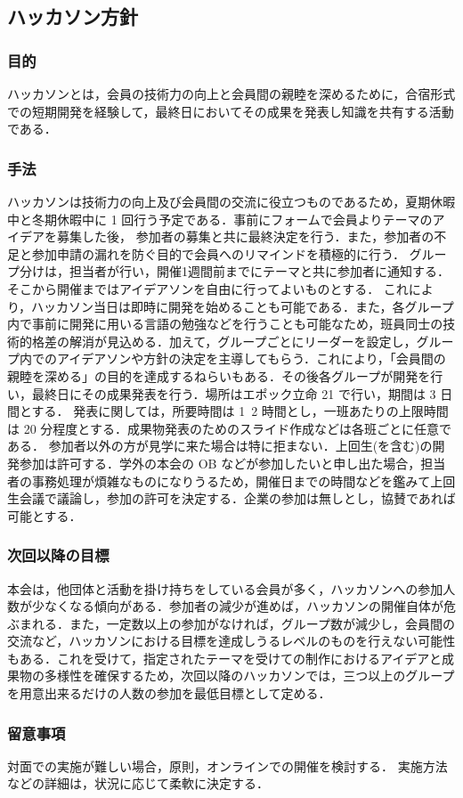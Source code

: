 \subsection*{ハッカソン方針}


\subsubsection*{目的}
ハッカソンとは，会員の技術力の向上と会員間の親睦を深めるために，合宿形式での短期開発を経験して，最終日においてその成果を発表し知識を共有する活動である．

\subsubsection*{手法}
ハッカソンは技術力の向上及び会員間の交流に役立つものであるため，夏期休暇中と冬期休暇中に 1 回行う予定である．事前にフォームで会員よりテーマのアイデアを募集した後，
参加者の募集と共に最終決定を行う．また，参加者の不足と参加申請の漏れを防ぐ目的で会員へのリマインドを積極的に行う．
グループ分けは，担当者が行い，開催1週間前までにテーマと共に参加者に通知する．
そこから開催まではアイデアソンを自由に行ってよいものとする．
これにより，ハッカソン当日は即時に開発を始めることも可能である．また，各グループ内で事前に開発に用いる言語の勉強などを行うことも可能なため，班員同士の技術的格差の解消が見込める．加えて，グループごとにリーダーを設定し，グループ内でのアイデアソンや方針の決定を主導してもらう．これにより，「会員間の親睦を深める」の目的を達成するねらいもある．その後各グループが開発を行い，最終日にその成果発表を行う．場所はエポック立命 21 で行い，期間は 3 日間とする．
発表に関しては，所要時間は 1~2 時間とし，一班あたりの上限時間は 20 分程度とする．成果物発表のためのスライド作成などは各班ごとに任意である．
参加者以外の方が見学に来た場合は特に拒まない．上回生(\fourthGrade を含む)の開発参加は許可する．学外の本会の OB などが参加したいと申し出た場合，担当者の事務処理が煩雑なものになりうるため，開催日までの時間などを鑑みて上回生会議で議論し，参加の許可を決定する．企業の参加は無しとし，協賛であれば可能とする．

\subsubsection*{次回以降の目標}
本会は，他団体と活動を掛け持ちをしている会員が多く，ハッカソンへの参加人数が少なくなる傾向がある．参加者の減少が進めば，ハッカソンの開催自体が危ぶまれる．また，一定数以上の参加がなければ，グループ数が減少し，会員間の交流など，ハッカソンにおける目標を達成しうるレベルのものを行えない可能性もある．これを受けて，指定されたテーマを受けての制作におけるアイデアと成果物の多様性を確保するため，次回以降のハッカソンでは，三つ以上のグループを用意出来るだけの人数の参加を最低目標として定める．

\subsubsection*{留意事項}
対面での実施が難しい場合，原則，オンラインでの開催を検討する．
実施方法などの詳細は，状況に応じて柔軟に決定する．
